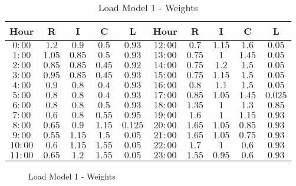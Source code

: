 \begin{table}[H]
\centering
\begin{tabular}{ccccc|ccccc}
\rowcolor{gray!25}
\textbf{Hour} & \textbf{R} & \textbf{I} & \textbf{C} & \textbf{L} & \textbf{Hour} & \textbf{R} & \textbf{I} & \textbf{C} & \textbf{L}\\
\hline
$0:00$ & $1.2$ & $0.9$ & $0.5$ & $0.93$ & $12:00$ & $0.7$ & $1.15$ & $1.6$ & $0.05$\\
\rowcolor{gray!15}
$1:00$ & $1.05$ & $0.85$ & $0.5$ & $0.93$ & $13:00$ & $0.75$ & $1$ & $1.45$ & $0.05$\\
$2:00$ & $0.85$ & $0.85$ & $0.45$ & $0.92$ & $14:00$ & $0.75$ & $1.2$ & $1.5$ & $0.05$\\
\rowcolor{gray!15}
$3:00$ & $0.95$ & $0.85$ & $0.45$ & $0.93$ & $15:00$ & $0.75$ & $1.15$ & $1.5$ & $0.05$\\
$4:00$ & $0.9$ & $0.8$ & $0.4$ & $0.93$ & $16:00$ & $0.8$ & $1.1$ & $1.5$ & $0.05$\\
\rowcolor{gray!15}
$5:00$ & $0.8$ & $0.8$ & $0.4$ & $0.93$ & $17:00$ & $0.85$ & $1.05$ & $1.45$ & $0.025$\\
$6:00$ & $0.8$ & $0.8$ & $0.5$ & $0.93$ & $18:00$ & $1.35$ & $1$ & $1.3$ & $0.85$\\
\rowcolor{gray!15}
$7:00$ & $0.6$ & $0.8$ & $0.55$ & $0.95$ & $19:00$ & $1.6$ & $1$ & $1.15$ & $0.93$\\
$8:00$ & $0.65$ & $0.9$ & $1.15$ & $0.125$ & $20:00$ & $1.65$ & $1.05$ & $0.85$ & $0.93$\\
\rowcolor{gray!15}
$9:00$ & $0.55$ & $1.15$ & $1.5$ & $0.05$ & $21:00$ & $1.65$ & $1.05$ & $0.75$ & $0.93$\\
$10:00$ & $0.6$ & $1.15$ & $1.55$ & $0.05$ & $22:00$ & $1.7$ & $1$ & $0.6$ & $0.93$\\
\rowcolor{gray!15}
$11:00$ & $0.65$ & $1.2$ & $1.55$ & $0.05$ & $23:00$ & $1.55$ & $0.95$ & $0.6$ & $0.93$\\
\hline
\end{tabular}
\caption{Load Model 1 - Weights}
\end{table}

\begin{figure}[H]
\centering
\setlength\figureheight{4cm}
\setlength\figurewidth{10cm}

\caption{Load Model 1 - Weights}
\end{figure}

